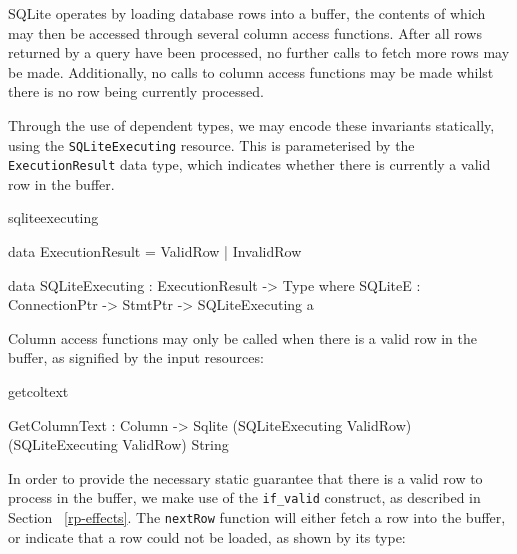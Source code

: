 
SQLite operates by loading database rows into a buffer, the contents of which may then be accessed through several column access functions. After all rows returned by a query have been processed, no further calls to fetch more rows may be made. Additionally, no calls to column access functions may be made whilst there is no row being currently processed. 

Through the use of dependent types, we may encode these invariants statically, using the \texttt{SQLiteExecuting} resource. This is parameterised by the \texttt{ExecutionResult} data type, which indicates whether there is currently a valid row in the buffer.

\begin{SaveVerbatim}{sqliteexecuting}

data ExecutionResult = ValidRow
                     | InvalidRow

data SQLiteExecuting : ExecutionResult -> Type where
  SQLiteE : ConnectionPtr -> 
            StmtPtr -> SQLiteExecuting a
  
\end{SaveVerbatim}
\noindent
Column access functions may only be called when there is a valid row in the
buffer, as signified by the input resources:

\begin{SaveVerbatim}{getcoltext}

GetColumnText : Column -> 
                Sqlite (SQLiteExecuting ValidRow) 
                       (SQLiteExecuting ValidRow)
                       String
                         
\end{SaveVerbatim}

\noindent
In order to provide the necessary static guarantee that there is a valid row to
process in the buffer, we make use of the \texttt{if\_valid} construct, as described in Section ~\ref{rp-effects}. The
\texttt{nextRow} function will either fetch a row into the buffer, or indicate
that a row could not be loaded, as shown by its type:


